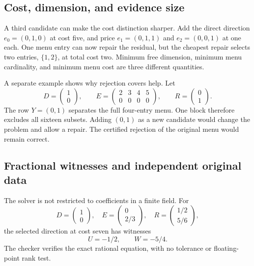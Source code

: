 \subsection{Cost, dimension, and evidence size}

A third candidate can make the cost distinction sharper. Add the direct direction $e_0=(0,1,0)$ at cost five, and price $e_1=(0,1,1)$ and $e_2=(0,0,1)$ at one each. One menu entry can now repair the residual, but the cheapest repair selects two entries, $\{1,2\}$, at total cost two. Minimum free dimension, minimum menu cardinality, and minimum menu cost are three different quantities.

A separate example shows why rejection covers help. Let
\[
 D=\begin{pmatrix}1\\0\end{pmatrix},\qquad
 E=\begin{pmatrix}2&3&4&5\\0&0&0&0\end{pmatrix},\qquad
 R=\begin{pmatrix}0\\1\end{pmatrix}.
\]
The row $Y=(0,1)$ separates the full four-entry menu. One block therefore excludes all sixteen subsets. Adding $(0,1)$ as a new candidate would change the problem and allow a repair. The certified rejection of the original menu would remain correct.


\subsection{Fractional witnesses and independent original data}

The solver is not restricted to coefficients in a finite field. For
\[
 D=\begin{pmatrix}1\\0\end{pmatrix},\quad
 E=\begin{pmatrix}0\\2/3\end{pmatrix},\quad
 R=\begin{pmatrix}1/2\\5/6\end{pmatrix},
\]
the selected direction at cost seven has witnesses
\[
 U=-1/2,\qquad W=-5/4.
\]
The checker verifies the exact rational equation, with no tolerance or floating-point rank test.

